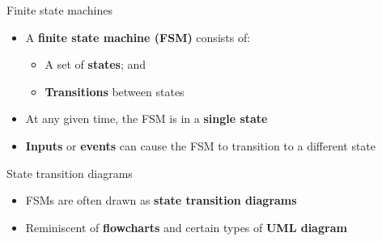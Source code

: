 
\begin{frame}{Finite state machines}
    \begin{itemize}
        \item A \textbf{finite state machine (FSM)} consists of: \pause
            \begin{itemize}
                \item A set of \textbf{states}; and \pause
                \item \textbf{Transitions} between states \pause
            \end{itemize}
        \item At any given time, the FSM is in a \textbf{single state} \pause
        \item \textbf{Inputs} or \textbf{events} can cause the FSM to transition to a different state
    \end{itemize}
\end{frame}

\begin{frame}{State transition diagrams}
    \begin{center}\end{center}
    \begin{itemize}
        \item FSMs are often drawn as \textbf{state transition diagrams}
        \item Reminiscent of \textbf{flowcharts} and certain types of \textbf{UML diagram} \pause
    \end{itemize}
\end{frame}

